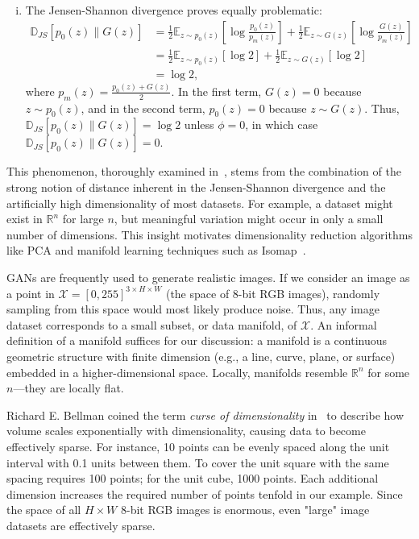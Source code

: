 \begin{example}
\begin{enumerate}[(i)]
		\item The Jensen-Shannon divergence proves equally problematic:
		      \begin{align}
			      \mathbb{D}_{JS}[p_0(z) \| G(z)] & = \frac{1}{2} \mathbb{E}_{z \sim p_0(z)}\left[\log\frac{p_0(z)}{p_m(z)}\right] + \frac{1}{2} \mathbb{E}_{z \sim G(z)}\left[\log\frac{G(z)}{p_m(z)}\right] \\
			                                      & = \frac{1}{2} \mathbb{E}_{z \sim p_0(z)}[\log 2] + \frac{1}{2} \mathbb{E}_{z \sim G(z)}[\log 2]                                                           \\
			                                      & = \log 2,
		      \end{align}
		      where $p_m(z) = \frac{p_0(z) + G(z)}{2}$. In the first term, $G(z) = 0$ because $z \sim p_0(z)$, and in the second term, $p_0(z) = 0$ because $z \sim G(z)$. Thus,
		      $\mathbb{D}_{JS}[p_0(z) \| G(z)] = \log 2$ unless $\phi = 0$, in which case
		      $\mathbb{D}_{JS}[p_0(z) \| G(z)] = 0$.
	\end{enumerate}
\end{example}

This phenomenon, thoroughly examined in~\cite{ref:arjovsky-towards-2017}, stems from the combination of the strong notion of distance inherent in the Jensen-Shannon divergence and the artificially high dimensionality of most datasets. For example, a dataset might exist in $\mathbb{R}^n$ for large $n$, but meaningful variation might occur in only a small number of dimensions. This insight motivates dimensionality reduction algorithms like PCA and manifold learning techniques such as Isomap~\cite{ref:tenenbaum-2000}.

GANs are frequently used to generate realistic images. If we consider an image as a point in $\mathcal{X} = [0, 255]^{3 \times H \times W}$ (the space of 8-bit RGB images), randomly sampling from this space would most likely produce noise. Thus, any image dataset corresponds to a small subset, or data manifold, of $\mathcal{X}$. An informal definition of a manifold suffices for our discussion: a \textnormal{\sffamily manifold} is a continuous geometric structure with finite dimension (e.g., a line, curve, plane, or surface) embedded in a higher-dimensional space. Locally, manifolds resemble $\mathbb{R}^n$ for some $n$—they are locally flat.

Richard E. Bellman coined the term \textit{curse of dimensionality} in~\cite{ref:bellman-1957} to describe how volume scales exponentially with dimensionality, causing data to become effectively sparse. For instance, 10 points can be evenly spaced along the unit interval with 0.1 units between them. To cover the unit square with the same spacing requires 100 points; for the unit cube, 1000 points. Each additional dimension increases the required number of points tenfold in our example. Since the space of all $H \times W$ 8-bit RGB images is enormous, even "large" image datasets are effectively sparse.

